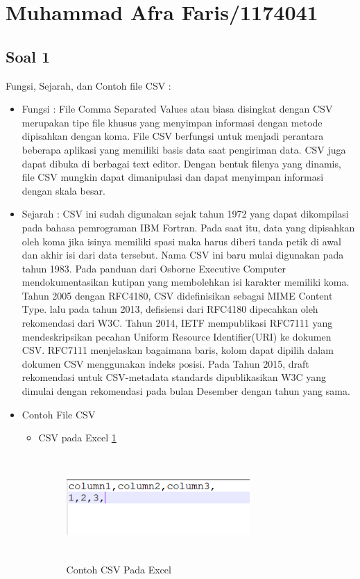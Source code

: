 
\section{Muhammad Afra Faris/1174041}
\subsection{Soal 1}
Fungsi, Sejarah, dan Contoh file CSV : 
\begin{itemize}
	\item Fungsi : 
	File Comma Separated Values atau  biasa disingkat dengan CSV merupakan tipe file khusus yang menyimpan informasi dengan metode dipisahkan dengan koma. File CSV berfungsi untuk menjadi perantara beberapa aplikasi yang memiliki basis data saat pengiriman data. CSV juga dapat dibuka di berbagai text editor. Dengan bentuk filenya yang dinamis, file CSV mungkin dapat dimanipulasi dan dapat menyimpan informasi dengan skala besar.
	\item Sejarah :
	CSV ini sudah digunakan sejak tahun 1972 yang dapat dikompilasi pada bahasa pemrograman IBM Fortran. Pada saat itu, data yang dipisahkan oleh koma jika isinya memiliki spasi maka harus diberi tanda petik di awal dan akhir isi dari data tersebut. Nama CSV ini baru mulai digunakan pada tahun 1983. Pada panduan dari Osborne Executive Computer mendokumentasikan kutipan yang membolehkan isi karakter memiliki koma.  Tahun 2005 dengan RFC4180, CSV didefinisikan sebagai MIME Content Type. lalu pada tahun 2013, defisiensi dari RFC4180 dipecahkan oleh rekomendasi dari W3C. Tahun 2014, IETF mempublikasi RFC7111 yang mendeskripsikan pecahan Uniform Resource Identifier(URI) ke dokumen CSV. RFC7111 menjelaskan bagaimana baris, kolom dapat dipilih dalam dokumen CSV menggunakan indeks posisi. Pada Tahun 2015,  draft rekomendasi untuk CSV-metadata standards dipublikasikan W3C yang dimulai dengan rekomendasi pada bulan Desember dengan tahun yang sama. 
	\item Contoh File CSV \begin{itemize}
							\item 
							CSV pada Excel \ref{csvex}
							\begin{figure}[!htbp]
								\centering
								\includegraphics[height=4cm, width=7cm]{figures/4/1174041/Teori/csvex.png}
								\caption{Contoh CSV Pada Excel}
								\label{csvex}
							\end{figure}
														
						  \end{itemize}
\end{itemize}
